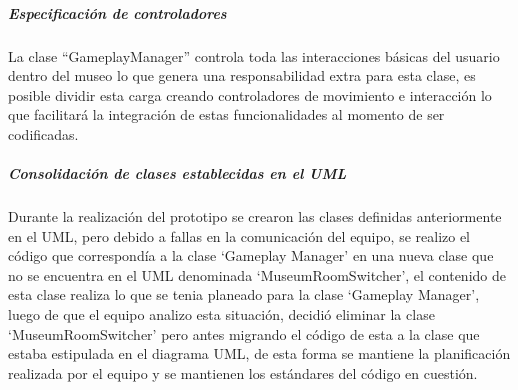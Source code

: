 \documentclass[12pt]{article}
\makeatletter
\renewcommand\paragraph{\@startsection{paragraph}{4}{\z@}%
	{-2.5ex\@plus -1ex \@minus -.25ex}%
	{1.25ex \@plus .25ex}%
	{\normalfont\normalsize\bfseries}}
\makeatother
\begin{document}
\subparagraph{\textbf{Especificación de controladores}}
La clase “GameplayManager” controla toda las interacciones básicas del usuario dentro del museo lo que genera una responsabilidad extra para esta clase, es posible dividir esta carga creando controladores de movimiento e interacción lo que facilitará la integración de estas funcionalidades al momento de ser codificadas.

\subparagraph{\textbf{Consolidación de clases establecidas en el UML}}
Durante la realización del prototipo se crearon las clases definidas anteriormente en el UML, pero debido a fallas en la comunicación del equipo, se realizo el código que correspondía a la clase `Gameplay Manager' en una nueva clase que no se encuentra en el UML denominada `MuseumRoomSwitcher', el contenido de esta clase realiza lo que se tenia planeado para la clase `Gameplay Manager', luego de que el equipo analizo esta situación, decidió eliminar la clase `MuseumRoomSwitcher' pero antes migrando el código de esta a la clase que estaba estipulada en el diagrama UML, de esta forma se mantiene la planificación realizada por el equipo y se mantienen los estándares del código en cuestión.



\newpage


\newpage

\end{document}
